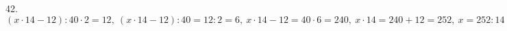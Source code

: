 42. $(x\cdot14-12):40\cdot2=12,\ (x\cdot14-12):40=12:2=6,\ x\cdot14-12=40\cdot6=240,\ x\cdot14=240+12=252,\ x=252:14=18.$\\
